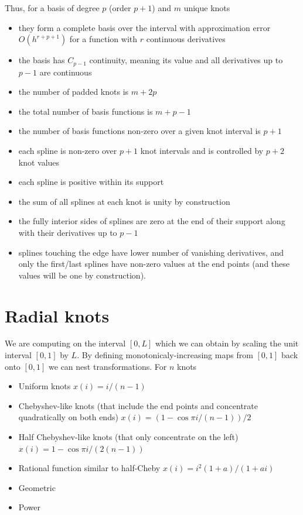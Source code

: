 \documentclass[12pt]{article}
\begin{document}
Thus, for a basis of degree $p$ (order $p+1$) and $m$ unique knots 
\begin{itemize}
\item they form a complete basis over the interval with approximation error $O\left(h^{r+p+1}\right)$ for a function with $r$ continuous derivatives 
\item the basis has $C_{p-1}$ continuity, meaning its value and all derivatives up to $p-1$ are continuous
\item the number of padded knots is $m + 2p$
\item the total number of basis functions is $m + p - 1$ 
\item the number of basis functions non-zero over a given knot interval is $p + 1$
\item each spline is non-zero over $p+1$ knot intervals and is controlled by $p+2$ knot values
\item each spline is positive within its support
\item the sum of all splines at each knot is unity by construction
\item the fully interior sides of splines are zero at the end of their support along with their derivatives up to $p-1$
\item splines touching the edge have lower number of vanishing derivatives, and only the first/last splines have non-zero values at the end points (and these values will be one by construction).
\end{itemize}

\section{Radial knots}

We are computing on the interval $[0,L]$ which we can obtain by scaling the unit interval $[0,1]$ by $L$.  By defining monotonicaly-increasing maps from $[0,1]$ back onto $[0,1]$ we can nest transformations.    For $n$ knots
\begin{itemize}
\item Uniform knots $x(i) = i/(n-1)$
\item Chebyshev-like knots (that include the end points and concentrate quadratically on both ends) $x(i) = (1-\cos \pi i / (n-1))/2$
\item Half Chebyshev-like knots (that only concentrate on the left) $x(i) = 1 - \cos \pi i / (2(n-1))$
\item Rational function similar to half-Cheby $x(i) = i^2 (1+a) / (1 + ai)$
\item Geometric
\item Power
\end{itemize}
\end{document}
